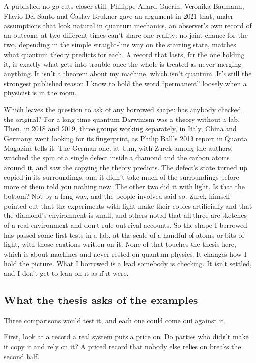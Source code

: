 \documentclass[11pt,twoside]{article}
\theoremstyle{thielethm}
\theoremstyle{thieledef}
\theoremstyle{thieledef}
\theoremstyle{thieledef}
\theoremstyle{thielethm}
\theoremstyle{thieleobs}
\theoremstyle{thielethm}
\begin{document}
A published no-go cuts closer still. Philippe Allard Guérin, Veronika Baumann, Flavio Del Santo and Časlav Brukner gave an argument in 2021 that, under assumptions that look natural in quantum mechanics, an observer's own record of an outcome at two different times can't share one reality: no joint chance for the two, depending in the simple straight-line way on the starting state, matches what quantum theory predicts for each. A record that lasts, for the one holding it, is exactly what gets into trouble once the whole is treated as never merging anything. It isn't a theorem about my machine, which isn't quantum. It's still the strongest published reason I know to hold the word ``permanent'' loosely when a physicist is in the room.

Which leaves the question to ask of any borrowed shape: has anybody checked the original? For a long time quantum Darwinism was a theory without a lab. Then, in 2018 and 2019, three groups working separately, in Italy, China and Germany, went looking for its fingerprint, as Philip Ball's 2019 report in Quanta Magazine tells it. The German one, at Ulm, with Zurek among the authors, watched the spin of a single defect inside a diamond and the carbon atoms around it, and saw the copying the theory predicts. The defect's state turned up copied in its surroundings, and it didn't take much of the surroundings before more of them told you nothing new. The other two did it with light. Is that the bottom? Not by a long way, and the people involved said so. Zurek himself pointed out that the experiments with light make their copies artificially and that the diamond's environment is small, and others noted that all three are sketches of a real environment and don't rule out rival accounts. So the shape I borrowed has passed some first tests in a lab, at the scale of a handful of atoms or bits of light, with those cautions written on it. None of that touches the thesis here, which is about machines and never rested on quantum physics. It changes how I hold the picture. What I borrowed is a lead somebody is checking. It isn't settled, and I don't get to lean on it as if it were.

\subsection{What the thesis asks of the examples}

Three comparisons would test it, and each one could come out against it.

First, look at a record a real system puts a price on. Do parties who didn't make it copy it and rely on it? A priced record that nobody else relies on breaks the second half.
\end{document}
